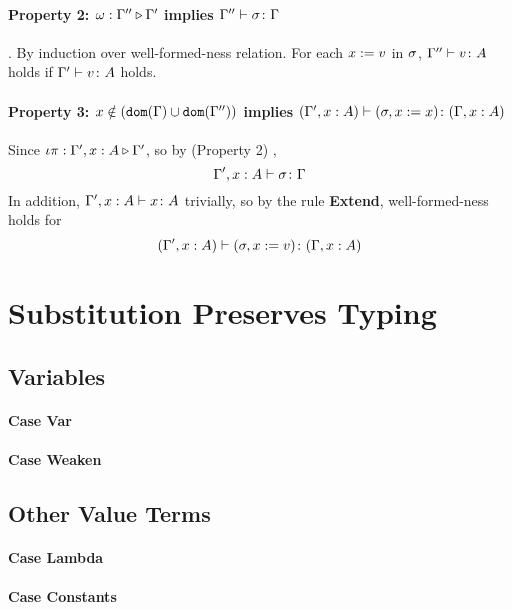 {        \paragraph{Property 2: $\omega : \Gamma'' \triangleright \Gamma'$ implies $\Gamma'' \vdash \sigma \colon \Gamma$}. 
        By induction over well-formed-ness relation. For each $x:= v$ in $\sigma$, $\Gamma'' \vdash v \colon A$ holds if $\Gamma' \vdash v \colon A$ holds.
        \paragraph{Property 3: $x \notin (\texttt{dom}(\Gamma) \cup \texttt{dom}(\Gamma''))$ implies $(\Gamma', x: A) \vdash (\sigma, x := x) \colon (\Gamma, x: A)$} 
        Since $\iota\pi : \Gamma',x: A \triangleright \Gamma'$, so by (Property 2) , 
        $$\Gamma', x: A \vdash \sigma \colon \Gamma$$
        In addition, $\Gamma', x: A \vdash x \colon A$ trivially, so by the rule \textbf{Extend}, well-formed-ness holds for
        \begin{equation}
            (\Gamma', x:A) \vdash (\sigma, x:= v) \colon (\Gamma, x: A)
        \end{equation}
    

    \section{Substitution Preserves Typing}
    
    \subsection{Variables}  
        \paragraph{Case Var}
           
            
        \paragraph{Case Weaken}
           
    \subsection{Other Value Terms}
    \paragraph{Case Lambda}
    \paragraph{Case Constants}
        
}

